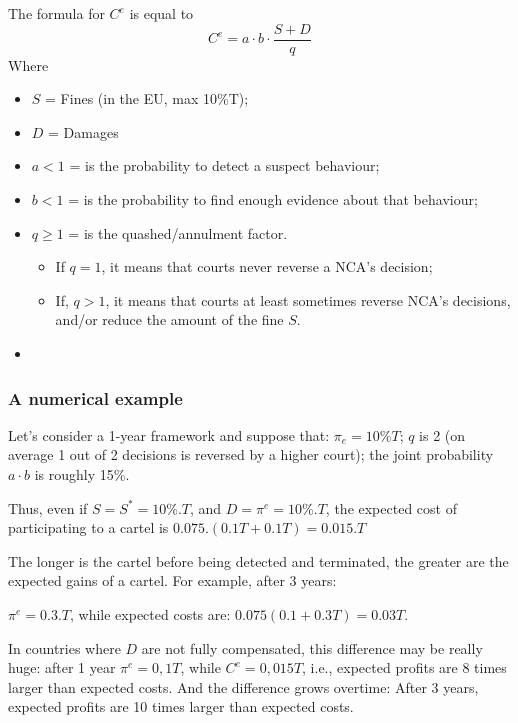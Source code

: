 \newpage
        The formula for $C^e$ is equal to
        \begin{equation}
            C^e = a \cdot b \cdot \frac{S+D}{q}
        \end{equation}
        Where
        \begin{itemize}
            \item $S$ = Fines (in the EU, max 10\%T);
            \item $D$ = Damages
            \item $a < 1$ = is the probability to detect a suspect behaviour;
            \item $b < 1$ = is the probability to find enough evidence about that behaviour;
            \item $q \geq 1$ = is the quashed/annulment factor.
                \begin{itemize}
                    \item If \( q = 1 \), it means that courts never reverse a NCA’s decision;
                    \item If, \(q > 1\), it means that courts at least sometimes reverse NCA’s decisions, and/or reduce the amount of the fine $S$.
                \end{itemize}
            \item 
        \end{itemize}

        \subsubsection{A numerical example}

        Let's consider a 1-year framework and suppose that: $\pi_e = 10\%T$; $q$ is 2 (on average 1 out of 2 decisions is reversed by a higher court); the joint probability \(a \cdot b\) is roughly 15\%.

        Thus, even if $S = S^* = 10\%.T$, and $D = \pi^e = 10\%.T$,
        the expected cost of participating to a cartel is $0.075.(0.1T+0.1T) = 0.015.T$
        
        The longer is the cartel before being detected and terminated, the greater are the
        expected gains of a cartel. For example, after 3 years:
        
        $\pi^e = 0.3.T$, while expected costs are: $0.075 (0.1+0.3T) = 0.03T$.
        
        In countries where $D$ are not fully compensated, this difference may be really huge: after 1 year $\pi^e = 0,1T$, while $C^e = 0,015 T$, i.e., expected profits are 8 times larger than expected costs. And the difference grows overtime: After 3 years, expected profits are 10 times larger than expected costs.
        
